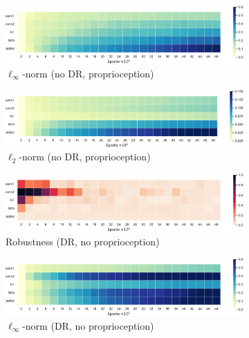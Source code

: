 \begin{figure}
  \begin{subfigure}{0.32\textwidth}
    \includegraphics[width=\textwidth]{figures/chapter6/robustness/fetch/sensor_std/inf_dist}
    \caption{$\ell_\infty$-norm (no DR, proprioception)}
  \end{subfigure}
  \begin{subfigure}{0.32\textwidth}
    \includegraphics[width=\textwidth]{figures/chapter6/robustness/fetch/sensor_std/l2_dist}
    \caption{$\ell_2$-norm (no DR, proprioception)}
  \end{subfigure}
  \begin{subfigure}{0.32\textwidth}
    \includegraphics[width=\textwidth]{figures/chapter6/robustness/fetch/visual_random/error}
    \caption{Robustness (DR, no proprioception)}
  \end{subfigure}
  \begin{subfigure}{0.32\textwidth}
    \includegraphics[width=\textwidth]{figures/chapter6/robustness/fetch/visual_random/inf_dist}
    \caption{$\ell_\infty$-norm (DR, no proprioception)}
  \end{subfigure}
  \begin{subfigure}{0.32\textwidth}

\end{subfigure}
\end{figure}
